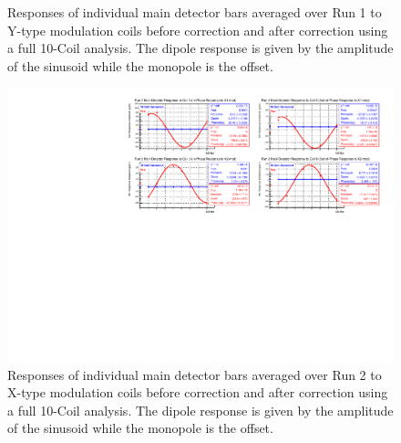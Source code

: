 \begin{landscape}
\begin{figure}[!ht]
\begin{center}
\caption{\label{fig:Run1_10coil_Ydipoles}Responses of individual main detector bars averaged over Run 1 to Y-type modulation coils before correction and after correction using a full 10-Coil analysis. The dipole response is given by the amplitude of the sinusoid while the monopole is the offset.}
\end{center}
\end{figure}

\begin{figure}[!ht]
\begin{center}
\includegraphics[width=9in]{./Pictures/Run2_X_dipole10-Coil.pdf}
\caption{\label{fig:Run2_10coil_Xdipoles_app}Responses of individual main detector bars averaged over Run 2 to X-type modulation coils before correction and after correction using a full 10-Coil analysis. The dipole response is given by the amplitude of the sinusoid while the monopole is the offset.}
\end{center}
\end{figure}


\end{landscape}
